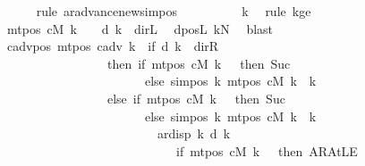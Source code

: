\begin{isabellebody}
\ \ \ \ \isamarkupfalse%
\ {\isacharparenleft}{\kern0pt}rule\ ar{\isacharunderscore}{\kern0pt}advance{\isacharunderscore}{\kern0pt}newsimpos{\isacharparenright}{\kern0pt}\isanewline
\ \ \ \ \ \ \isamarkupfalse%
\ {\isachardoublequoteopen}{}\ {\isasymle}\ {\isacharquery}{\kern0pt}k{\isachardoublequoteclose}\ \isamarkupfalse%
\ {\isacharparenleft}{\kern0pt}rule\ kge{}{\isacharparenright}{\kern0pt}\isanewline
\ \ \ \ \ \ \isamarkupfalse%
\ {\isachardoublequoteopen}mt{\isacharunderscore}{\kern0pt}pos\ cM\ k\ {\isacharequal}{\kern0pt}\ {}\ {\isasymLongrightarrow}\ d\ k\ {\isasymnoteq}\ dir{\isachardot}{\kern0pt}L{\isachardoublequoteclose}\ \isamarkupfalse%
\ dposL\ kN\ \isamarkupfalse%
\ blast\isanewline
\ \ \ \ \isamarkupfalse%
\isanewline
\ \ \ \ \isamarkupfalse%
\ c{\isacharunderscore}{\kern0pt}adv{\isacharunderscore}{\kern0pt}pos{\isacharcolon}{\kern0pt}\ {\isachardoublequoteopen}mt{\isacharunderscore}{\kern0pt}pos\ c{\isacharunderscore}{\kern0pt}adv\ k\ {\isacharequal}{\kern0pt}\ {\isacharparenleft}{\kern0pt}if\ d\ k\ {\isacharequal}{\kern0pt}\ dir{\isachardot}{\kern0pt}R\isanewline
\ \ \ \ \ \ \ \ \ \ \ \ \ \ \ \ \ then\ {\isacharparenleft}{\kern0pt}if\ mt{\isacharunderscore}{\kern0pt}pos\ cM\ k\ {\isacharequal}{\kern0pt}\ {}\ then\ Suc\ {}\isanewline
\ \ \ \ \ \ \ \ \ \ \ \ \ \ \ \ \ \ \ \ \ \ \ else\ sim{\isacharunderscore}{\kern0pt}pos\ {\isacharquery}{\kern0pt}k\ {\isacharparenleft}{\kern0pt}mt{\isacharunderscore}{\kern0pt}pos\ cM\ k{\isacharparenright}{\kern0pt}\ {\isacharplus}{\kern0pt}\ {\isacharquery}{\kern0pt}k{\isacharparenright}{\kern0pt}\isanewline
\ \ \ \ \ \ \ \ \ \ \ \ \ \ \ \ \ else\ {\isacharparenleft}{\kern0pt}if\ mt{\isacharunderscore}{\kern0pt}pos\ cM\ k\ {\isacharequal}{\kern0pt}\ {}\ then\ Suc\ {}\isanewline
\ \ \ \ \ \ \ \ \ \ \ \ \ \ \ \ \ \ \ \ \ \ \ else\ sim{\isacharunderscore}{\kern0pt}pos\ {\isacharquery}{\kern0pt}k\ {\isacharparenleft}{\kern0pt}mt{\isacharunderscore}{\kern0pt}pos\ cM\ k{\isacharparenright}{\kern0pt}\ {\isacharplus}{\kern0pt}\ {\isacharquery}{\kern0pt}k{\isacharparenright}{\kern0pt}\isanewline
\ \ \ \ \ \ \ \ \ \ \ \ \ \ \ \ \ \ \ \ \ \ \ \ {\isacharminus}{\kern0pt}\ ar{\isacharunderscore}{\kern0pt}disp\ {\isacharquery}{\kern0pt}k\ {\isacharparenleft}{\kern0pt}d\ k{\isacharparenright}{\kern0pt}\isanewline
\ \ \ \ \ \ \ \ \ \ \ \ \ \ \ \ \ \ \ \ \ \ \ \ \ \ \ \ {\isacharparenleft}{\kern0pt}if\ mt{\isacharunderscore}{\kern0pt}pos\ cM\ k\ {\isacharequal}{\kern0pt}\ {}\ then\ AR{\isacharunderscore}{\kern0pt}AtLE\isanewline

\end{isabellebody}
